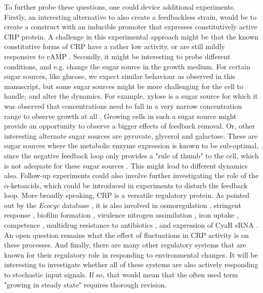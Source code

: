 To further probe these questions, one could device additional experiments.
%
Firstly, an interesting alternative to also create a feedbackless strain, would be to
create a construct with an inducible promoter that expresses 
constitutively active CRP protein. %
A challenge in this experimental approach might be that the known constitutive forms of CRP have a rather low activity, or are still mildly responsive to cAMP \cite{Aiba1985, Garges1985}.
%
Secondly, it might be interesting to probe different conditions, and e.g. change the sugar source in the growth medium.
For certain sugar sources, like glucose, we expect similar behaviour as observed in this manuscript, 
but some sugar sources might be more challenging for the cell to handle, and alter the dynamics.
% 
For example, xylose is a sugar source for which it was observed that concentrations need to fall in a very narrow concentration range to observe growth at all \cite{Towbin2017personalcomm}. 
Growing cells in such a sugar source might provide an opportunity to observe a bigger effects of feedback removal. %
%
Or, other interesting alternate sugar sources are pyruvate, glycerol and galactose. These are sugar sources where the metabolic enzyme expression is known to be sub-optimal, since the negative feedback loop only provides a "rule of thumb" to the cell, which is not adequate for these sugar sources \cite{Towbin2017}. 
%
This might lead to different dynamics also.
%
Follow-up experiments could also involve further investigating the role of the $\alpha$-ketoacids, 
which could be introduced in experiments to disturb the feedback loop.
%
More broadly speaking, 
CRP is a versatile regulatory protein.%
%
As pointed out by the \textit{Ecocyc} database \cite{Keseler2017}, it is also involved in 
osmoregulation \cite{Landis1999},
stringent response \cite{Johansson2000}, 
biofilm formation \cite{Jackson2002}, 
virulence \cite{Baga1985} %
nitrogen assimilation \cite{Mao2007, Paul2007}, 
iron uptake \cite{Zhang2005}, 
competence \cite{Sinha2009}, 
multidrug resistance to antibiotics \cite{Hirakawa2006a}, 
and expression of CyaR sRNA \cite{DeLay2009a}.
%
An open question remains what the effect of fluctuations in CRP activity is on these processes.
%
%
And finally,
there are many %
other 
regulatory systems 
that are known for their regulatory role in responding to environmental changes.
It will be interesting to
investigate whether all of these systems are also actively responding to stochastic input signals.
%
If so, 
that would mean that the often used term "growing in steady state" requires thorough revision.


